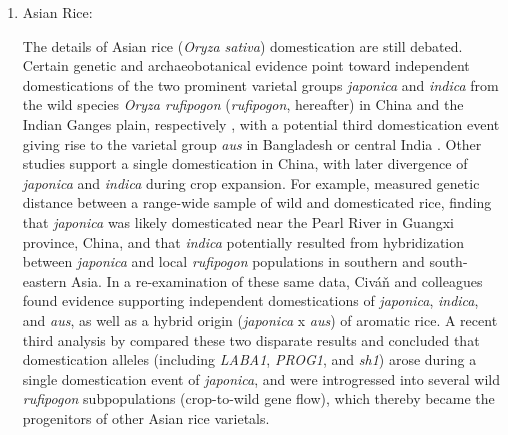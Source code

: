 \documentclass[11pt]{article}
\begin{document}
{\begin{enumerate}
\citet{Poets2015} recently investigated the range-wide contribution of wild barley to landraces, assessing both genome-wide and geographical patterns of introgression.
This study identified several lines of evidence consistent with wild introgression aiding the expansion and adaptation of domesticated barley.
The authors utilized ancestry deconvolution methods to identify genomic regions of shared ancestry, which linked particular landraces to numerous wild relative populations.
These results suggest landraces may have received wild introgression on a continual basis during post-domestication expansion.
However, barley landraces also showed an excess of ancestry from nearby wild relatives, indicating a prevalence of local and potentially adaptive gene flow.
Limited admixture linkage disequilibrium and small tracts of identity by state suggest substantial recombination has occurred since initial crop-wild hybridization and that even locally introgressed chromosomal regions are ancient, perhaps dating to the early expansion of barley post-domestication.
While these patterns suggest the possibility of adaptive introgression, wild barley haplotypes have yet to be definitively linked to specific adaptations in landraces.

\item{Asian Rice:}

The details of Asian rice (\emph{Oryza sativa}) domestication are still debated.
Certain genetic and archaeobotanical evidence point toward independent domestications of the two prominent varietal groups \emph{japonica} and \emph{indica} from the wild species \emph{Oryza rufipogon} (\emph{rufipogon}, hereafter) in China and the Indian Ganges plain, respectively \citep{fuller2010consilience}, with a potential third domestication event giving rise to the varietal group \emph{aus} in Bangladesh or central India \citep{civavn2015three}.
Other studies support a single domestication in China, with later divergence of \emph{japonica} and \emph{indica} \citep{molina2011molecular, Huang2012} during crop expansion.
For example, \citet{Huang2012} measured genetic distance between a range-wide sample of wild and domesticated rice, finding that \emph{japonica} was likely domesticated near the Pearl River in Guangxi province, China, and that \emph{indica} potentially resulted from hybridization between \emph{japonica} and local \emph{rufipogon} populations in southern and south-eastern Asia.
In a re-examination of these same data, Civ\'{a}\v{n} and colleagues \citeyearpar{civavn2015three} found evidence supporting independent domestications of \emph{japonica}, \emph{indica}, and \emph{aus}, as well as a hybrid origin (\emph{japonica} x \emph{aus}) of aromatic rice.
A recent third analysis by \citet{choi2018multiple} compared these two disparate results and concluded that domestication alleles (including \emph{LABA1}, \emph{PROG1}, and \emph{sh1}) arose during a single domestication event of \emph{japonica}, and were introgressed into several wild \emph{rufipogon} subpopulations (crop-to-wild gene flow), which thereby became the progenitors of other Asian rice varietals.


\end{enumerate}}
\end{document}
